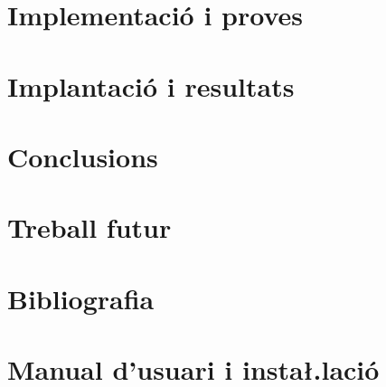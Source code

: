 \documentclass[11pt,a4paper,twoside]{report}
\begin{document}
  

  \chapter{Implementació i proves}
   
  
    
  \chapter{Implantació i resultats}
   
   

  \chapter{Conclusions}
  \chapter{Treball futur}
  \chapter{Bibliografia}
  \chapter{Manual d'usuari i insta\l.lació}
  
  
  
\end{document}
